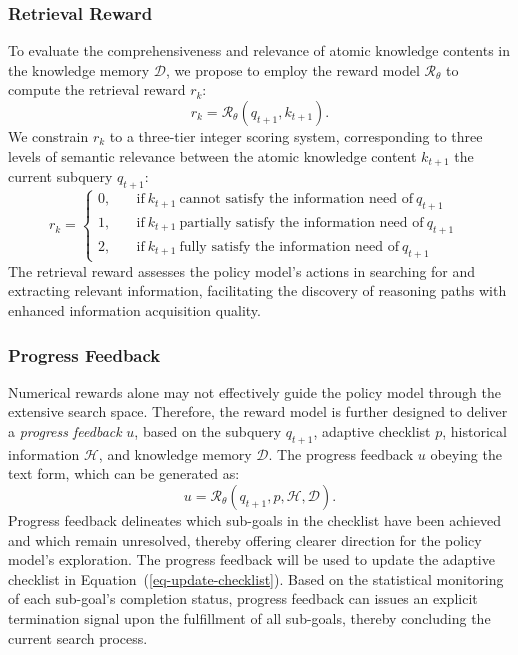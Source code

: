 \subsubsection{Retrieval Reward}
To evaluate the comprehensiveness and relevance of atomic knowledge contents in the knowledge memory $\mathcal{D}$, we propose to employ the reward model $\mathcal{R}_\theta$ to compute the retrieval reward $r_k$:
\begin{equation}
    r_{k} = \mathcal{R}_\theta(q_{t+1}, k_{t+1}).
\end{equation}
We constrain $r_{k}$ to a three-tier integer scoring system, corresponding to three levels of semantic relevance between the atomic knowledge content $k_{t+1}$ the current subquery $q_{t+1}$:
\begin{equation}
r_k=\left\{
\begin{aligned}
0, \quad &\text{if}~k_{t+1}~\text{cannot satisfy the information need of}~q_{t+1}& \\
1, \quad &\text{if}~k_{t+1}~\text{partially satisfy the information need of}~q_{t+1}& \\
2, \quad &\text{if}~k_{t+1}~\text{fully satisfy the information need of}~q_{t+1}&
\end{aligned}
\right. \nonumber
\end{equation}
The retrieval reward assesses the policy model’s actions in searching for and extracting relevant information, facilitating the discovery of reasoning paths with enhanced information acquisition quality.





\subsubsection{Progress Feedback}
\label{sec:feedback}
Numerical rewards alone may not effectively guide the policy model through the extensive search space. Therefore, the reward model is further designed to deliver a \textit{progress feedback} $u$, based on the subquery $q_{t+1}$, adaptive checklist $p$, historical information $\mathcal{H}$, and knowledge memory $\mathcal{D}$. The progress feedback $u$ obeying the text form, which can be generated as:
\begin{equation}
    u = \mathcal{R}_\theta(q_{t+1}, p, \mathcal{H}, \mathcal{D}).
\end{equation}
Progress feedback delineates which sub-goals in the checklist have been achieved and which remain unresolved, thereby offering clearer direction for the policy model's exploration. The progress feedback will be used to update the adaptive checklist in Equation~(\ref{eq-update-checklist}).
Based on the statistical monitoring of each sub-goal’s completion status, progress feedback can issues an explicit termination signal upon the fulfillment of all sub-goals, thereby concluding the current search process.

